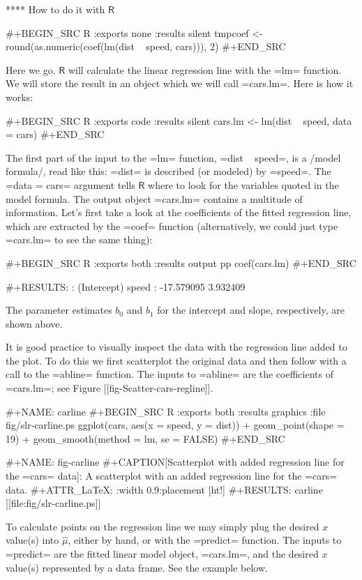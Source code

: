 **** How to do it with \(\mathsf{R}\)

#+BEGIN_SRC R :exports none :results silent
tmpcoef <- round(as.numeric(coef(lm(dist ~ speed, cars))), 2)
#+END_SRC

Here we go. \(\mathsf{R}\) will calculate the linear regression line
with the =lm= function. We will store the result in an object which we
will call =cars.lm=. Here is how it works:

#+BEGIN_SRC R :exports code :results silent
cars.lm <- lm(dist ~ speed, data = cars)
#+END_SRC

The first part of the input to the =lm= function, =dist ~ speed=, is a
/model formula/, read like this: =dist= is described (or modeled) by
=speed=. The =data = cars= argument tells \(\mathsf{R}\) where to look
for the variables quoted in the model formula. The output object
=cars.lm= contains a multitude of information. Let's first take a look
at the coefficients of the fitted regression line, which are extracted
by the =coef= function (alternatively, we could just type =cars.lm= to
see the same thing):

#+BEGIN_SRC R :exports both :results output pp 
coef(cars.lm)
#+END_SRC

#+RESULTS:
: (Intercept)       speed 
:  -17.579095    3.932409

The parameter estimates \( b_{0} \) and \( b_{1} \) for the intercept
and slope, respectively, are shown above. 

It is good practice to visually inspect the data with the regression
line added to the plot. To do this we first scatterplot the original
data and then follow with a call to the =abline= function. The inputs
to =abline= are the coefficients of =cars.lm=; see Figure
[[fig-Scatter-cars-regline]].

#+NAME: carline
#+BEGIN_SRC R :exports both :results graphics :file fig/slr-carline.ps
ggplot(cars, aes(x = speed, y = dist)) + 
  geom_point(shape = 19) + 
  geom_smooth(method = lm, se = FALSE)
#+END_SRC

#+NAME: fig-carline
#+CAPTION[Scatterplot with added regression line for the =cars= data]: \small A scatterplot with an added regression line for the =cars= data.
#+ATTR_LaTeX: :width 0.9\textwidth :placement [ht!]
#+RESULTS: carline
[[file:fig/slr-carline.ps]]

To calculate points on the regression line we may simply plug the
desired \(x\) value(s) into \( \hat{\mu} \), either by hand, or with
the =predict= function. The inputs to =predict= are the fitted linear
model object, =cars.lm=, and the desired \(x\) value(s) represented by
a data frame. See the example below.

